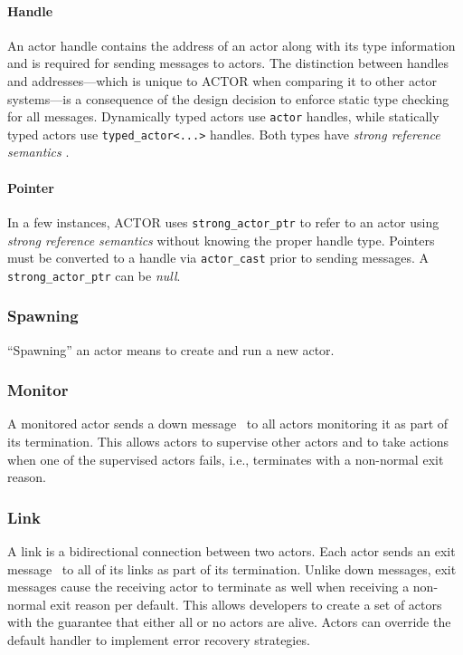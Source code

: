 \paragraph{Handle}
\label{actor-handle}

An actor handle contains the address of an actor along with its type
information and is required for sending messages to actors. The distinction
between handles and addresses---which is unique to ACTOR when comparing it to
other actor systems---is a consequence of the design decision to enforce static
type checking for all messages. Dynamically typed actors use \lstinline^actor^
handles, while statically typed actors use \lstinline^typed_actor<...>^
handles. Both types have \emph{strong reference semantics}
.

\paragraph{Pointer}
\label{actor-pointer}

In a few instances, ACTOR uses \lstinline^strong_actor_ptr^ to refer to an actor
using \emph{strong reference semantics}  without
knowing the proper handle type. Pointers must be converted to a handle via
\lstinline^actor_cast^  prior to sending messages. A
\lstinline^strong_actor_ptr^ can be \emph{null}.

\subsubsection{Spawning}

``Spawning'' an actor means to create and run a new actor.

\subsubsection{Monitor}
\label{monitor}

A monitored actor sends a down message~ to all actors
monitoring it as part of its termination. This allows actors to supervise other
actors and to take actions when one of the supervised actors fails, i.e.,
terminates with a non-normal exit reason.

\subsubsection{Link}
\label{link}

A link is a bidirectional connection between two actors. Each actor sends an
exit message~ to all of its links as part of its termination.
Unlike down messages, exit messages cause the receiving actor to terminate as
well when receiving a non-normal exit reason per default. This allows
developers to create a set of actors with the guarantee that either all or no
actors are alive. Actors can override the default handler to implement error
recovery strategies.

